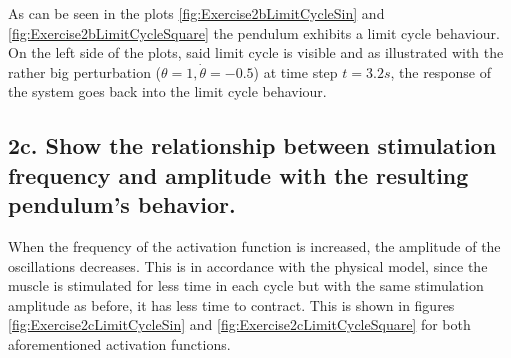 \documentclass{cmc}
\begin{document}
As can be seen in the plots \ref{fig:Exercise2bLimitCycleSin} and \ref{fig:Exercise2bLimitCycleSquare} the pendulum exhibits a limit cycle behaviour. On the left side of the plots, said limit cycle is visible and as illustrated with the rather big perturbation ($\theta = 1, \dot{\theta} = -0.5$) at time step $t=3.2s$, the response of the system goes back into the limit cycle behaviour. 


\subsection*{2c. Show the relationship between stimulation
  frequency and amplitude with the resulting pendulum's behavior.}
\label{sec:2e}

When the frequency of the activation function is increased, the amplitude of the oscillations decreases. This is in accordance with the physical model, since the muscle is stimulated for less time in each cycle but with the same stimulation amplitude as before, it has less time to contract. This is shown in figures \ref{fig:Exercise2cLimitCycleSin} and \ref{fig:Exercise2cLimitCycleSquare} for both aforementioned activation functions. 
\end{document}
